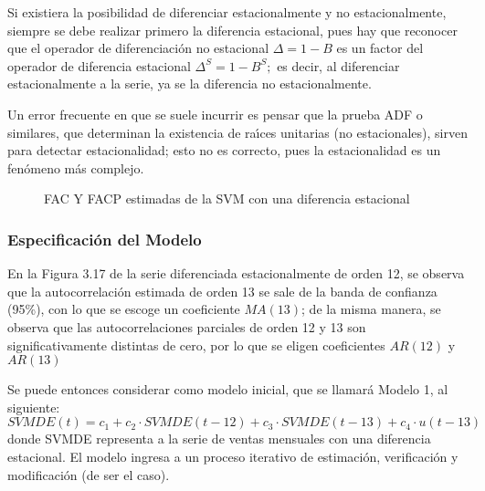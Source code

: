 \begin{observacion}
Si existiera la posibilidad de diferenciar 
estacionalmente y no estacionalmente, siempre se debe realizar primero la 
diferencia estacional, pues hay que reconocer que el operador de 
diferenciaci\'{o}n no estacional ${\Delta }=1-B$ es un factor del 
operador de diferencia estacional 
${\Delta }^{S}=1-B^{S};$ es decir, al diferenciar estacionalmente a 
la serie, ya se la diferencia no estacionalmente.  
\end{observacion}


\begin{observacion}
Un error frecuente en que se suele incurrir 
es pensar que la prueba ADF o similares, que determinan la existencia de 
ra\'{\i}ces unitarias (no estacionales), sirven para detectar 
estacionalidad; esto no es correcto, pues la estacionalidad es un 
fen\'{o}meno m\'{a}s complejo.
\end{observacion}

\begin{figure}[H]
\centering
\caption{FAC Y FACP estimadas de la SVM con una diferencia estacional}
\end{figure}


\subsubsection{Especificaci\'{o}n del Modelo}

En la Figura 3.17 de la serie diferenciada estacionalmente de orden 12, se 
observa que la autocorrelaci\'{o}n estimada de orden 13 se sale de la banda 
de confianza (95{\%}), con lo que se escoge un coeficiente $MA(13)$; de la 
misma manera, se observa que las autocorrelaciones parciales de orden 12 y 
13 son significativamente distintas de cero, por lo que se eligen 
coeficientes $AR(12)$ y $AR(13)$

Se puede entonces considerar como modelo inicial, que se llamar\'{a} Modelo 
1, al siguiente:
\[
SVMDE\left( t \right)=c_{1}+c_{2}\cdot SVMDE\left( t-12 \right)+c_{3}\cdot 
SVMDE\left( t-13 \right)+c_{4}\cdot u(t-13)
\]
donde SVMDE representa a la serie de ventas mensuales con una diferencia 
estacional. El modelo ingresa a un proceso iterativo de estimaci\'{o}n, 
verificaci\'{o}n y modificaci\'{o}n (de ser el caso).

